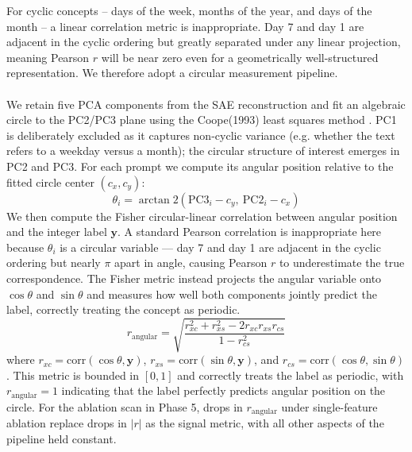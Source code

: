 \documentclass[11pt]{article}
\begin{document}
For cyclic concepts -- days of the week, months of the year, and days of the month -- a linear correlation metric is inappropriate.
Day 7 and day 1 are adjacent in the cyclic ordering but greatly separated under any linear projection, meaning Pearson $r$ will be near 
zero even for a geometrically well-structured representation. We therefore adopt a circular measurement pipeline. 
\\
\\
We retain five PCA components from the SAE reconstruction and fit an algebraic circle to the PC2/PC3 plane using the Coope(1993) least squares
method \cite{coope1993}. PC1 is deliberately excluded as it captures non-cyclic variance (e.g. whether the text refers to a weekday versus a month);
the circular structure of interest emerges in PC2 and PC3. For each prompt we compute its angular position relative to the fitted circle center $(c_x, c_y)$:
$$\theta_i = \arctan2\left(\text{PC3}_i - c_y,\ \text{PC2}_i - c_x\right)$$
We then compute the Fisher circular-linear correlation between angular position and the integer label $\mathbf{y}$. A standard Pearson correlation 
is inappropriate here because $\theta_i$ is a circular variable — day 7 and day 1 are adjacent in the cyclic ordering but nearly $\pi$ apart in angle, 
causing Pearson $r$ to underestimate the true correspondence. The Fisher metric instead projects the angular variable onto $\cos\theta$ and $\sin\theta$ 
and measures how well both components jointly predict the label, correctly treating the concept as periodic.
$$r_{\text{angular}} = \sqrt{\frac{r_{xc}^2 + r_{xs}^2 - 2r_{xc}r_{xs}r_{cs}}{1 - r_{cs}^2}}$$
where $r_{xc} = \text{corr}(\cos\theta, \mathbf{y})$, $r_{xs} = \text{corr}(\sin\theta, \mathbf{y})$, 
and $r_{cs} = \text{corr}(\cos\theta, \sin\theta)$. This metric is bounded in $[0, 1]$ and correctly treats the label as 
periodic, with $r_{\text{angular}} = 1$ indicating that the label perfectly predicts angular position on the circle. For the ablation scan in Phase 5, 
drops in $r_{\text{angular}}$ under single-feature ablation replace drops in $|r|$ as the signal metric, with all other aspects of the pipeline held 
constant.
\end{document}
